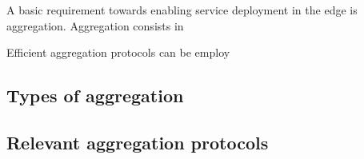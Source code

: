 
A basic requirement towards enabling service deployment in the edge is aggregation. Aggregation consists in 

Efficient aggregation protocols can be employ

\subsection{Types of aggregation}

\subsection{Relevant aggregation protocols}
